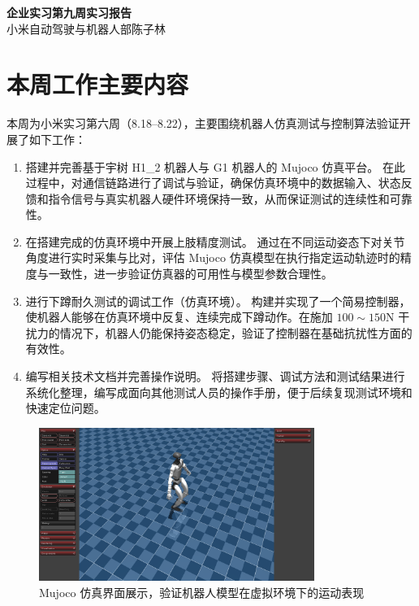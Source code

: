 \documentclass{ctexart}
\begin{document}
\begin{center}
    \LARGE \textbf{企业实习\;第九周实习报告}\\
    \vspace{10pt}
    \normalsize 小米自动驾驶与机器人部\;\;陈子林
\end{center}

\section{本周工作主要内容}

本周为小米实习第六周（8.18--8.22），主要围绕机器人仿真测试与控制算法验证开展了如下工作：

\begin{enumerate}
    \item 搭建并完善基于宇树 H1\_2 机器人与 G1 机器人的 Mujoco 仿真平台。  
    在此过程中，对通信链路进行了调试与验证，确保仿真环境中的数据输入、状态反馈和指令信号与真实机器人硬件环境保持一致，从而保证测试的连续性和可靠性。  
    
    \item 在搭建完成的仿真环境中开展上肢精度测试。  
    通过在不同运动姿态下对关节角度进行实时采集与比对，评估 Mujoco 仿真模型在执行指定运动轨迹时的精度与一致性，进一步验证仿真器的可用性与模型参数合理性。  
    
    \item 进行下蹲耐久测试的调试工作（仿真环境）。  
    构建并实现了一个简易控制器，使机器人能够在仿真环境中反复、连续完成下蹲动作。在施加 $100\sim150\text{N}$ 干扰力的情况下，机器人仍能保持姿态稳定，验证了控制器在基础抗扰性方面的有效性。  
    
    \item 编写相关技术文档并完善操作说明。  
    将搭建步骤、调试方法和测试结果进行系统化整理，编写成面向其他测试人员的操作手册，便于后续复现测试环境和快速定位问题。
\end{enumerate}

\begin{figure}[H]
      \centering
      \includegraphics[width = 0.8\textwidth]{mujoco_visualize.png}
      \caption{Mujoco 仿真界面展示，验证机器人模型在虚拟环境下的运动表现}
\end{figure}
\end{document}
